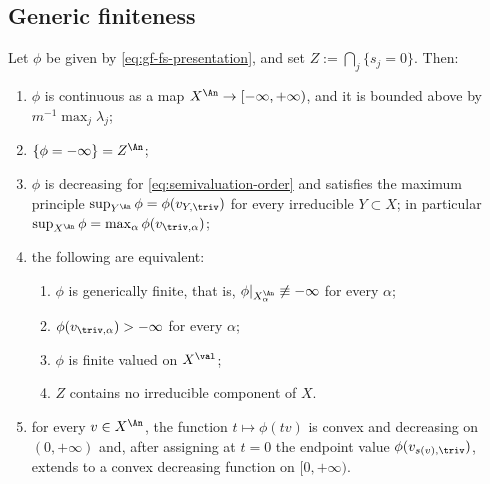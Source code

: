 \subsection{Generic finiteness}

\begin{proposition}
\label{prop:ch34-generic-finiteness}
Let $\phi$ be given by \eqref{eq:gf-fs-presentation}, and set
$Z:=\bigcap_j\{s_j=0\}$.  Then:
\begin{enumerate}
\item\label{itm:ch34-gf:cont}
  $\phi$ is continuous as a map $X^{\An}\to[-\infty,+\infty)$, and it is
  bounded above by $m^{-1}\max_j\lambda_j$;
\item\label{itm:ch34-gf:polar}
  $\{\phi=-\infty\}=Z^{\An}$;
\item\label{itm:ch34-gf:decreasing}
  $\phi$ is decreasing for \eqref{eq:semivaluation-order} and satisfies
  the maximum principle
  $\sup_{Y^{\An}}\phi=\phi(v_{Y,\triv})$ for every irreducible
  $Y\subset X$; in particular
  $\sup_{X^{\An}}\phi=\max_\alpha\phi(v_{\triv,\alpha})$;
\item\label{itm:ch34-gf:equiv}
  the following are equivalent:
  \begin{enumerate}
  \item $\phi$ is generically finite, that is,
    $\phi|_{X_\alpha^{\An}}\not\equiv-\infty$ for every $\alpha$;
  \item $\phi(v_{\triv,\alpha})>-\infty$ for every $\alpha$;
  \item $\phi$ is finite valued on $X^{\val}$;
  \item $Z$ contains no irreducible component of $X$.
  \end{enumerate}
\item\label{itm:ch34-gf:convex}
  for every $v\in X^{\An}$, the function
  $t\mapsto\phi(tv)$ is convex and decreasing on $(0,+\infty)$ and,
  after assigning at $t=0$ the endpoint value
  $\phi(v_{s(v),\triv})$, extends to a convex decreasing function on
  $[0,+\infty)$.
\end{enumerate}
\par
\end{proposition}

